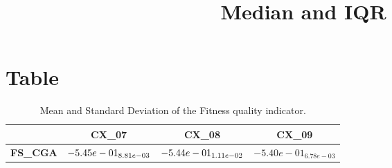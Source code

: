 \documentclass{article}
\title{Median and IQR}
\author{}
\begin{document}
\maketitle
\section{Table}
\begin{table}[!htp]
  \caption{Mean and Standard Deviation of the Fitness quality indicator.}
  \label{table:Fitness}
  \centering
  \begin{scriptsize}
  \begin{tabular}{c|ccc}
      & \textbf{CX\_07} & \textbf{CX\_08} & \textbf{CX\_09} \\\hline
      \textbf{FS_CGA} & $\cellcolor{gray25} -5.45e-01_{8.81e-03} $ & $ \cellcolor{gray95} -5.44e-01_{1.11e-02} $ & $ -5.40e-01_{6.78e-03}$ \\
  \end{tabular}
  \end{scriptsize}
\end{table}
\end{document}
